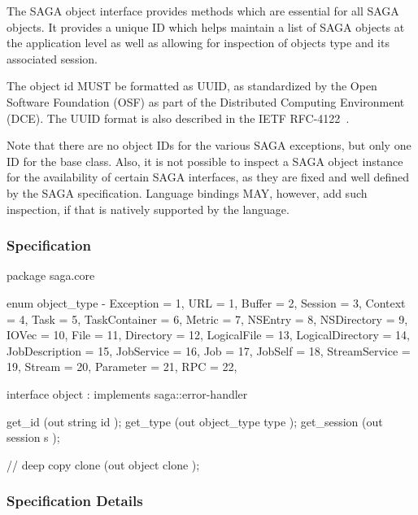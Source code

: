  
  The SAGA object interface provides methods which are essential
  for all SAGA objects.  It provides a unique ID which helps
  maintain a list of SAGA objects at the application level as
  well as allowing for inspection of objects type and its
  associated session.
        
  The object id MUST be formatted as UUID, as standardized by
  the Open Software Foundation (OSF) as part of the Distributed
  Computing Environment (DCE).  The UUID format is also
  described in the IETF RFC-4122~\cite{rfc-4122}.
 
  Note that there are no object IDs for the various
  SAGA exceptions, but only one ID for the 
  base class. Also, it is not possible to inspect a SAGA object
  instance for the availability of certain SAGA interfaces, as
  they are fixed and well defined by the SAGA specification.
  Language bindings MAY, however, add such inspection, if that
  is natively supported by the language.
 
 \subsubsection{Specification}
 
 \begin{myspec}
  package saga.core
  {
    enum object_type
    {
-     Exception        =   1,
      URL              =   1,
      Buffer           =   2,
      Session          =   3,
      Context          =   4,
      Task             =   5,
      TaskContainer    =   6,
      Metric           =   7,
      NSEntry          =   8,
      NSDirectory      =   9,
      IOVec            =  10,
      File             =  11,
      Directory        =  12,
      LogicalFile      =  13,
      LogicalDirectory =  14,
      JobDescription   =  15,
      JobService       =  16,
      Job              =  17,
      JobSelf          =  18,
      StreamService    =  19,
      Stream           =  20,
      Parameter        =  21,
      RPC              =  22,
    }
 
 
    interface object : implements saga::error-handler
    {
      get_id       (out string      id     );
      get_type     (out object_type type   );
      get_session  (out session     s      );
 
      // deep copy
      clone        (out object      clone  );
    }
  }
 \end{myspec}
 
 
 \subsubsection{Specification Details}
 
